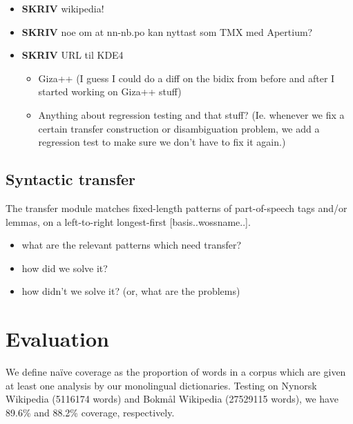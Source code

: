 \documentclass[11pt]{article}
\begin{document}
\begin{itemize}

\item \textbf{SKRIV} wikipedia!\\
\label{sec-3.4.1}


\item \textbf{SKRIV} noe om at nn-nb.po kan nyttast som TMX med Apertium?\\
\label{sec-3.4.2}




\item \textbf{SKRIV} URL til KDE4\\
\label{sec-3.4.3}


\begin{itemize}
\item Giza++ (I guess I could do a diff on the bidix from before and after
  I started working on Giza++ stuff)
\item Anything about regression testing and that stuff? (Ie. whenever we
  fix a certain transfer construction or disambiguation problem, we
  add a regression test to make sure we don't have to fix it again.)
\end{itemize}
\end{itemize} %
\subsection{Syntactic transfer}
\label{sec-3.5}

The transfer module matches fixed-length patterns of part-of-speech
tags and/or lemmas, on a left-to-right longest-first
[basis..wossname..]. 

\begin{itemize}
\item what are the relevant patterns which need transfer?
\item how did we solve it?
\item how didn't we solve it? (or, what are the problems)
\end{itemize}
\section{Evaluation}
\label{sec-4}

  \label{SEC:eval}
We define naïve coverage as the proportion of words in a corpus which
are given at least one analysis by our monolingual
dictionaries. Testing on Nynorsk Wikipedia (5116174 words) and Bokmål
Wikipedia (27529115 words), we have 89.6\% and 88.2\% coverage,
respectively.
\end{document}
